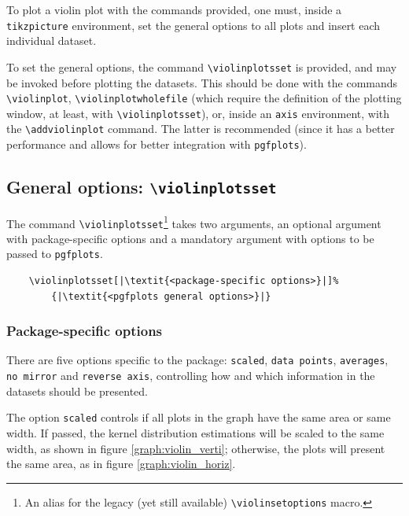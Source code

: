\documentclass{article}
\begin{document}
To plot a violin plot with the commands provided, one must, inside
a \texttt{tikzpicture} environment, set the general options to all
plots and insert each individual dataset.

To set the general options, the command \texttt{{\textbackslash}violinplotsset}
is provided, and may be invoked before plotting the datasets. This should
be done with the commands \texttt{{\textbackslash}violinplot},
\texttt{{\textbackslash}violinplotwholefile} (which require the definition of
the plotting window, at least, with \texttt{{\textbackslash}violinplotsset}),
or, inside an \texttt{axis} environment, with the
\texttt{{\textbackslash}addviolinplot} command. The latter is recommended (since
it has a better performance and allows for better integration with
\texttt{pgfplots}).

\subsection{General options: \texttt{{\textbackslash}violinplotsset}}

The command \texttt{{\textbackslash}violinplotsset}\footnote{%
	An alias for the legacy (yet still available)
	\texttt{{\textbackslash}violinsetoptions} macro.
} takes two arguments, an optional argument with package-specific options and a
mandatory argument with options to be passed to \texttt{pgfplots}.

\begin{verbatim}
	\violinplotsset[|\textit{<package-specific options>}|]%
		{|\textit{<pgfplots general options>}|}
\end{verbatim}

\subsubsection{Package-specific options}

There are five options specific to the package: \texttt{scaled},
\texttt{data points}, \texttt{averages}, \texttt{no mirror} and
\texttt{reverse axis}, controlling how and which information
in the datasets should be presented.

The option \texttt{scaled} controls if all plots in the graph
have the same area or same width. If passed, the kernel
distribution estimations will be scaled to the same width, as
shown in figure \ref{graph:violin_verti}; otherwise, the plots
will present the same area, as in figure \ref{graph:violin_horiz}.
\end{document}
